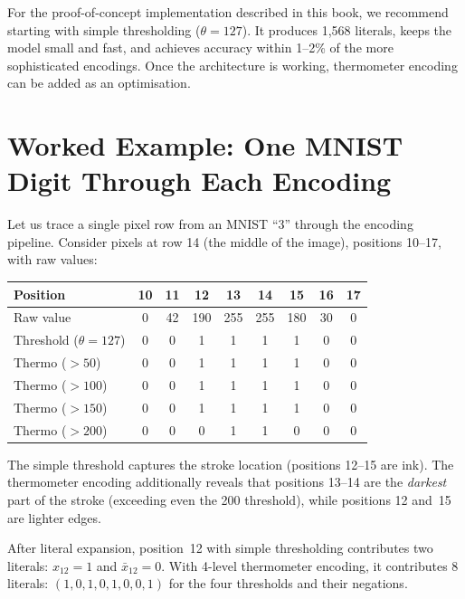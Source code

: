 \begin{engineernote}
For the proof-of-concept implementation described in this book, we
recommend starting with simple thresholding ($\theta = 127$). It
produces 1{,}568 literals, keeps the model small and fast, and achieves
accuracy within 1--2\% of the more sophisticated encodings. Once the
architecture is working, thermometer encoding can be added as an
optimisation.
\end{engineernote}


\section{Worked Example: One MNIST Digit Through Each Encoding}
\label{sec:encoding-walkthrough}

Let us trace a single pixel row from an MNIST ``3'' through the
encoding pipeline. Consider pixels at row 14 (the middle of the
image), positions 10--17, with raw values:

\begin{center}
\begin{tabular}{@{}l*{8}{c}@{}}
  \toprule
  \textbf{Position} & 10 & 11 & 12 & 13 & 14 & 15 & 16 & 17 \\
  \midrule
  Raw value & 0 & 42 & 190 & 255 & 255 & 180 & 30 & 0 \\
  \midrule
  Threshold ($\theta = 127$) & 0 & 0 & 1 & 1 & 1 & 1 & 0 & 0 \\
  \midrule
  Thermo ($>50$) & 0 & 0 & 1 & 1 & 1 & 1 & 0 & 0 \\
  Thermo ($>100$) & 0 & 0 & 1 & 1 & 1 & 1 & 0 & 0 \\
  Thermo ($>150$) & 0 & 0 & 1 & 1 & 1 & 1 & 0 & 0 \\
  Thermo ($>200$) & 0 & 0 & 0 & 1 & 1 & 0 & 0 & 0 \\
  \bottomrule
\end{tabular}
\end{center}

The simple threshold captures the stroke location (positions 12--15
are ink). The thermometer encoding additionally reveals that positions
13--14 are the \emph{darkest} part of the stroke (exceeding even the
200 threshold), while positions 12 and~15 are lighter edges.

After literal expansion, position~12 with simple thresholding
contributes two literals: $x_{12} = 1$ and $\bar{x}_{12} = 0$.
With 4-level thermometer encoding, it contributes 8 literals:
$(1, 0, 1, 0, 1, 0, 0, 1)$ for the four thresholds and their
negations.
